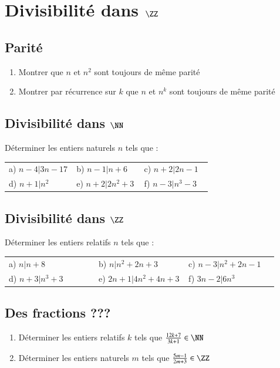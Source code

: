 \documentclass[oneside,12pt]{article}          %
\begin{document}
\section{Divisibilité dans $\ZZ$}

\subsection{Parité}
\begin{enumerate}
    \item Montrer que $n$ et $n^2$ sont toujours de même parité
    \item Montrer par récurrence sur $k$ que $n$ et $n^k$ sont toujours de même parité
\end{enumerate}



\subsection{Divisibilité dans $\NN$}
Déterminer les entiers naturels $n$ tels que :

\renewcommand{\arraystretch}{1.2}
\begin{tabular}{p{0.33\linewidth} p{0.33\linewidth} p{0.33\linewidth}}
	a) $n-4\vert 3n-17$ & b) $n-1 \vert n+6$ & c) $n+2 \vert 2n-1$ \\
	d) $n+1 \vert n^2$ & e) $n+2 \vert 2n^2+3$ & f) $n-3 \vert n^3-3$
\end{tabular} 
        
        
        
\subsection{Divisibilité dans $\ZZ$}
Déterminer les entiers relatifs $n$ tels que :

\renewcommand{\arraystretch}{1.2}
\begin{tabular}{p{0.33\linewidth} p{0.33\linewidth} p{0.33\linewidth}}
	a) $n \vert n+8$ & b) $n \vert n^2+2n+3$ & c) $n-3 \vert n^2+2n-1$ \\
	d) $n+3 \vert n^3+3$ & e) $2n+1 \vert 4n^2+4n+3$ & f) $3n-2 \vert 6n^3$
\end{tabular} 



\subsection{Des fractions ???}
\begin{enumerate}
	\item Déterminer les entiers relatifs $k$ tels que $\frac{12k+7}{3k+1}\in\NN$ 
	\item Déterminer les entiers naturels $m$ tels que $\frac{5m-1}{2m+3}\in\ZZ$
\end{enumerate}
\end{document}
